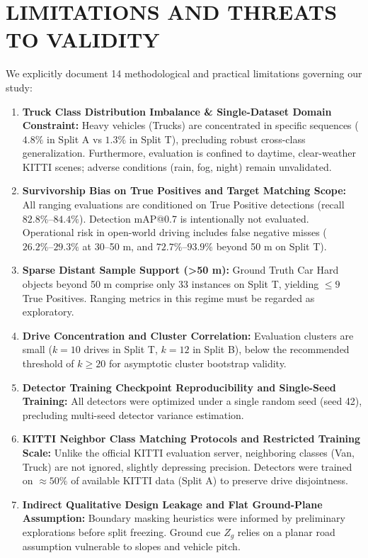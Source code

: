 \documentclass[]{spie}  %
\begin{document}
\section{LIMITATIONS AND THREATS TO VALIDITY}
\label{sec:limitations}

We explicitly document 14 methodological and practical limitations governing our study:
\begin{enumerate}
    \item \textbf{Truck Class Distribution Imbalance \& Single-Dataset Domain Constraint:} Heavy vehicles (Trucks) are concentrated in specific sequences ($4.8\%$ in Split A vs $1.3\%$ in Split T), precluding robust cross-class generalization. Furthermore, evaluation is confined to daytime, clear-weather KITTI scenes; adverse conditions (rain, fog, night) remain unvalidated.
    \item \textbf{Survivorship Bias on True Positives and Target Matching Scope:} All ranging evaluations are conditioned on True Positive detections (recall $82.8\%\text{--}84.4\%$). Detection mAP@0.7 is intentionally not evaluated. Operational risk in open-world driving includes false negative misses ($26.2\%\text{--}29.3\%$ at 30--50 m, and $72.7\%\text{--}93.9\%$ beyond 50 m on Split T).
    \item \textbf{Sparse Distant Sample Support (>50 m):} Ground Truth Car Hard objects beyond 50 m comprise only 33 instances on Split T, yielding $\le 9$ True Positives. Ranging metrics in this regime must be regarded as exploratory.
    \item \textbf{Drive Concentration and Cluster Correlation:} Evaluation clusters are small ($k = 10$ drives in Split T, $k = 12$ in Split B), below the recommended threshold of $k \ge 20$ for asymptotic cluster bootstrap validity.
    \item \textbf{Detector Training Checkpoint Reproducibility and Single-Seed Training:} All detectors were optimized under a single random seed (seed 42), precluding multi-seed detector variance estimation.
    \item \textbf{KITTI Neighbor Class Matching Protocols and Restricted Training Scale:} Unlike the official KITTI evaluation server, neighboring classes (Van, Truck) are not ignored, slightly depressing precision. Detectors were trained on $\approx 50\%$ of available KITTI data (Split A) to preserve drive disjointness.
    \item \textbf{Indirect Qualitative Design Leakage and Flat Ground-Plane Assumption:} Boundary masking heuristics were informed by preliminary explorations before split freezing. Ground cue $Z_g$ relies on a planar road assumption vulnerable to slopes and vehicle pitch.

\end{enumerate}
\end{document}
